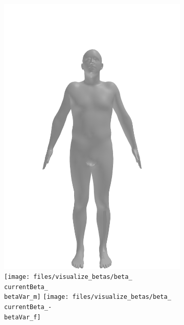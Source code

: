\begin{figure}[h!]
\begin{subfigure}{\betaWidth}
        \includegraphics[width=\imgWidth]{files/visualize_betas/baseline_m}
        \texttt{[image: files/visualize\_betas/beta\_\\currentBeta\_\\betaVar\_m]}
        \linebreak
        \texttt{[image: files/visualize\_betas/beta\_\\currentBeta\_-\\betaVar\_f]}

\end{subfigure}
\end{figure}
